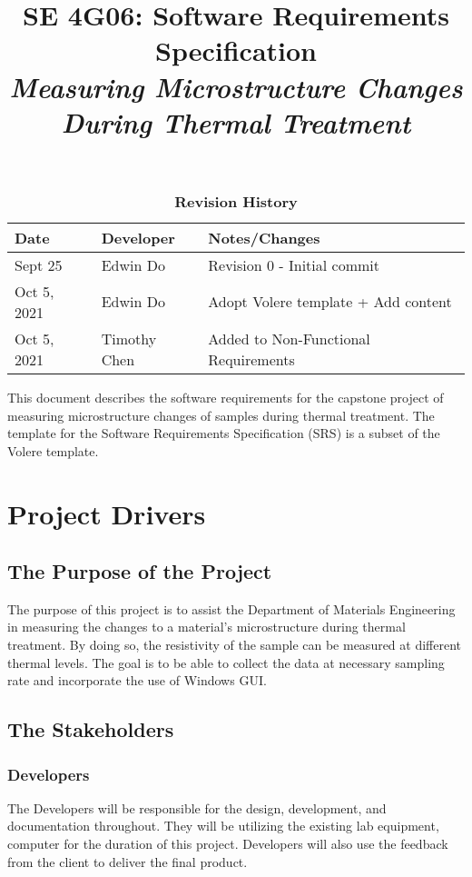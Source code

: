 \documentclass[12pt, titlepage]{article}
\title{SE 4G06: Software Requirements Specification\\\textit{Measuring Microstructure Changes During Thermal Treatment }}
\author{\authname}
\date{}
\begin{document}
\maketitle

\tableofcontents
\listoftables
\listoffigures

\begin{table}[bp]
\caption{\bf Revision History}
\begin{tabularx}{\textwidth}{p{3cm}p{2cm}X}
\toprule {\bf Date} & {\bf Developer} & {\bf Notes/Changes}\\
\midrule
Sept 25 & Edwin Do & Revision 0 - Initial commit\\
Oct 5, 2021 & Edwin Do & Adopt Volere template + Add content \\
Oct 5, 2021 & Timothy Chen & Added to Non-Functional Requirements\\

\bottomrule
\end{tabularx}
\end{table}

\newpage


This document describes the software requirements for the capstone project of measuring microstructure changes of samples during thermal treatment. The template for the Software Requirements Specification (SRS) is a subset of the Volere
template.


\section{Project Drivers}

\subsection{The Purpose of the Project}
The purpose of this project is to assist the Department of Materials Engineering in measuring the changes to a material's microstructure during thermal treatment. 
By doing so, the resistivity of the sample can be measured at different thermal levels. The goal is to be able to collect the data at necessary sampling rate and 
incorporate the use of Windows GUI. 

\subsection{The Stakeholders}

\subsubsection{Developers}
The Developers will be responsible for the design, development, and documentation throughout. They will be utilizing the existing lab equipment, computer for the duration of this project.
Developers will also use the feedback from the client to deliver the final product. 
\end{document}
